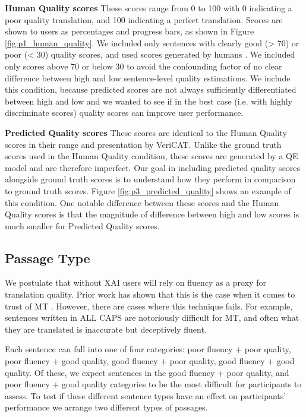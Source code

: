 \begin{compacthang}
    \item \textbf{Human Quality scores} These scores range from 0 to 100 with 0 indicating a poor quality translation, and 100 indicating a perfect translation. Scores are shown to users as percentages and progress bars, as shown in Figure \ref{fig:p1_human_quality}. We included only sentences with clearly good (> 70) or poor (< 30) quality scores, and used scores generated by humans . We included only scores above 70 or below 30 to avoid the confounding factor of no clear difference between high and low sentence-level quality estimations. We include this condition, because predicted scores are not always sufficiently differentiated between high and low and we wanted to see if in the best case (i.e. with highly discriminate scores) quality scores can improve user performance.  

    \item \textbf{Predicted Quality scores} These scores are identical to the Human Quality scores in their range and presentation by VeriCAT. Unlike the ground truth scores used in the Human Quality condition, these scores are generated by a QE model and are therefore imperfect. Our goal in including predicted quality scores alongside ground truth scores is to understand how they perform in comparison to ground truth scores. Figure \ref{fig:p3_predicted_quality} shows an example of this condition. One notable difference between these scores and the Human Quality scores is that the magnitude of difference between high and low scores is much smaller for Predicted Quality scores.   
    
\end{compacthang}

\subsection{Passage Type}
We postulate that without XAI users will rely on fluency as a proxy for translation quality. Prior work has shown that this is the case when it comes to trust of MT \cite{martindaleFluency2018}. However, there are cases where this technique fails. For example, sentences written in ALL CAPS are notoriously difficult for MT, and often what they are translated is inaccurate but deceptively fluent. 

Each sentence can fall into one of four categories: poor fluency + poor quality, poor fluency + good quality, good fluency + poor quality, good fluency + good quality. Of these, we expect  sentences in the good fluency + poor quality, and poor fluency + good quality categories to be the most difficult for participants to assess. To test if these different sentence types have an effect on participants’ performance we arrange two different types of passages. 

